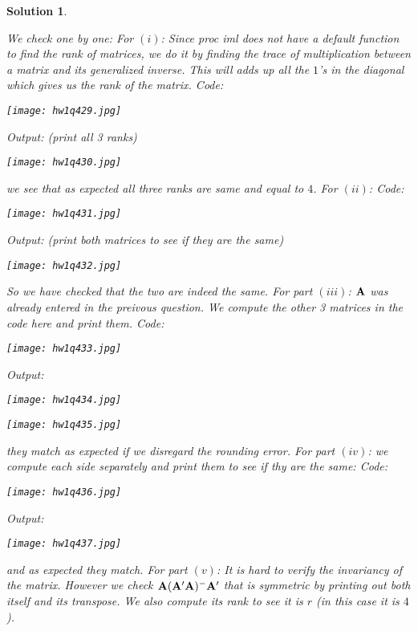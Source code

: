 \documentclass[11pt]{article}\usepackage[]{graphicx}\usepackage[]{color}
\newtheorem{sol}{Solution}
\begin{document}
\begin{sol}
\begin{enumerate}
	\end{enumerate}
	We check one by one:\vskip 2mm
	For $(i)$:\vskip 2mm
	Since proc iml does not have a default function to find the rank of matrices, we do it by finding the trace of multiplication between a matrix and its generalized inverse. This will adds up all the $1$'s in the diagonal which gives us the rank of the matrix.\vskip 2mm
	Code:
	\begin{center}
		\texttt{[image: hw1q429.jpg]}
	\end{center}
	Output: (print all 3 ranks)
	\begin{center}
		\texttt{[image: hw1q430.jpg]}
	\end{center}
	we see that as expected all three ranks are same and equal to $4$.\vskip 2mm
	For $(ii)$:\vskip 2mm
	Code:
	\begin{center}
		\texttt{[image: hw1q431.jpg]}
	\end{center}
	Output: (print both matrices to see if they are the same)
	\begin{center}
		\texttt{[image: hw1q432.jpg]}
	\end{center}
	So we have checked that the two are indeed the same.
	\vskip 2mm
	For part $(iii)$:\vskip 2mm
	${\bf A}$ was already entered in the preivous question. We compute the other 3 matrices in the code here and print them.\vskip 2mm
	Code:
	\begin{center}
		\texttt{[image: hw1q433.jpg]}
	\end{center}
	Output:
	\begin{center}
		\texttt{[image: hw1q434.jpg]}
	\end{center}
	\begin{center}
		\texttt{[image: hw1q435.jpg]}
	\end{center}
	they match as expected if we disregard the rounding error.\vskip 2mm
	For part $(iv)$:\vskip 2mm
	we compute each side separately and print them to see if thy are the same:\vskip 2mm
	Code:
	\begin{center}
		\texttt{[image: hw1q436.jpg]}
	\end{center}
	Output:
	\begin{center}
		\texttt{[image: hw1q437.jpg]}
	\end{center}
	and as expected they match.\vskip 2mm
	For part $(v)$: \vskip 2mm
	It is hard to verify the invariancy of the matrix. However we check ${\bf A}({\bf A}'{\bf A})^{-}{\bf A}'$ that is symmetric by printing out both itself and its transpose. We also compute its rank to see it is $r$ (in this case it is $4$).\vskip 2mm

\end{sol}
\end{document}
